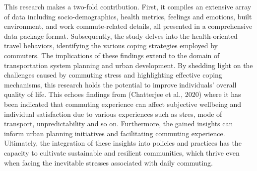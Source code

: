 \documentclass[
11pt, %
oneside, %
english, %
singlespacing, %
]{macthesis} %
\begin{document}
This research makes a two-fold contribution. First, it compiles an extensive array of data including socio-demographics, health metrics, feelings and emotions, built environment, and work commute-related details, all presented in a comprehensive data package format. Subsequently, the study delves into the health-oriented travel behaviors, identifying the various coping strategies employed by commuters.
The implications of these findings extend to the domain of transportation system planning and urban development. By shedding light on the challenges caused by commuting stress and highlighting effective coping mechanisms, this research holds the potential to improve individuals' overall quality of life. This echoes findings from (Chatterjee et al., 2020) where it has been indicated that commuting experience can affect subjective wellbeing and individual satisfaction due to various experiences such as stres, mode of transport, unpredictability and so on.
Furthermore, the gained insights can inform urban planning initiatives and facilitating commuting experience. Ultimately, the integration of these insights into policies and practices has the capacity to cultivate sustainable and resilient communities, which thrive even when facing the inevitable stresses associated with daily commuting.
\clearpage


\clearpage


\tableofcontents %

\listoffigures %

\listoftables %

\end{document}
